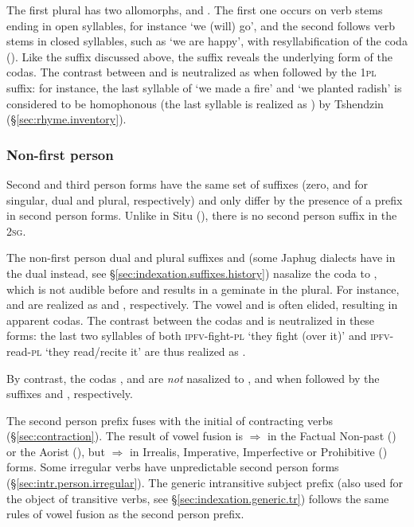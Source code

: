 The first plural  has two allomorphs,  and . The first one occurs on verb stems ending in open syllables, for instance  `we (will) go', and the second follows verb stems in closed syllables, such as  `we are happy', with resyllabification of the coda (). Like the  suffix discussed above, the suffix  reveals the underlying form of the codas. The contrast between  and  is neutralized as  when followed by the \textsc{1pl} suffix: for instance, the last syllable of  `we made a fire'  and  `we planted radish' is considered to be homophonous (the last syllable is realized as ) by Tshendzin (§\ref{sec:rhyme.inventory}).

\subsubsection{Non-first person} \label{sec:intr.23}
Second and third person forms have the same set of suffixes (zero,  and  for singular, dual and plural, respectively) and only differ by the presence of a  prefix in second person forms. Unlike in Situ (\citealt[197--208]{linxr93jiarong}), there is no second person suffix in the \textsc{2sg}.

The non-first person dual and plural suffixes  and  (some Japhug dialects have  in the dual instead, see §\ref{sec:indexation.suffixes.history}) nasalize the coda  to , which is not audible before  and results in a geminate in the plural. For instance,  and  are realized as  and , respectively. The vowel  and  is often elided, resulting in apparent  codas. The contrast between the codas  and  is neutralized in these forms: the last two syllables of both  \textsc{ipfv}-fight-\textsc{pl} `they fight (over it)' and   \textsc{ipfv}-read-\textsc{pl} `they read/recite it' are thus realized as . 

By contrast, the codas ,  and  are \textit{not} nasalized to ,  and  when followed by the suffixes  and , respectively.

The second person  prefix fuses with the initial  of contracting verbs (§\ref{sec:contraction}). The result of vowel fusion is  $\Rightarrow$  in the Factual Non-past () or the Aorist (), but  $\Rightarrow$  in Irrealis, Imperative, Imperfective or Prohibitive () forms. Some irregular verbs have unpredictable second person forms (§\ref{sec:intr.person.irregular}). The generic intransitive subject prefix  (also used for the object of transitive verbs, see §\ref{sec:indexation.generic.tr}) follows the same rules of vowel fusion as the second person prefix.


